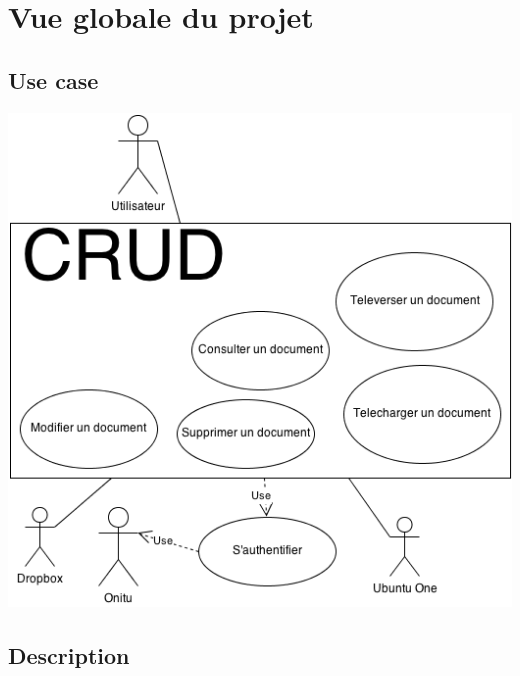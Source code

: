 \chapter{Vue globale du projet}
\thispagestyle{EIP}

\section{Use case}
\includegraphics[scale= 0.85]{use_case.png}

\section{Description}
